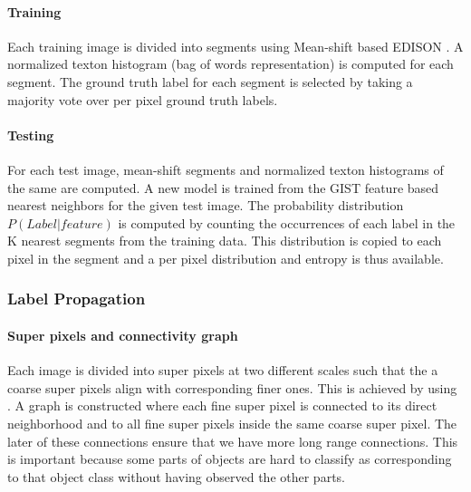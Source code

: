 \documentclass{article} %
\begin{document}
\paragraph{Training} Each training image is divided into segments using
Mean-shift based EDISON \cite{meanshift}.
A normalized texton histogram (bag of words representation) is computed for each segment.
The ground truth label for each segment is selected by taking a majority vote over per pixel ground truth labels.

\paragraph{Testing} For each test image, mean-shift segments and normalized texton histograms of the same are computed.
A new model is trained from the GIST feature based nearest neighbors for the given test image.
The probability distribution $P(Label | feature)$ is computed by counting the occurrences of each label in the K nearest segments from the training data.
This distribution is copied to each pixel in the segment and a per pixel distribution and entropy is thus available.

\subsubsection{Label Propagation}
\paragraph{Super pixels and connectivity graph}
\label{sec:labprop}
Each image is divided into super pixels at two different scales such that
the a coarse super pixels align with corresponding finer ones.
This is achieved by using \cite{}.%
A graph is constructed where each fine super pixel is connected to its
direct neighborhood and to all fine super pixels inside the same
coarse super pixel.
The later of these connections ensure that we have more long range connections. This is important because some parts of objects are hard to classify as corresponding to that object class without having observed the other parts.
\end{document}
